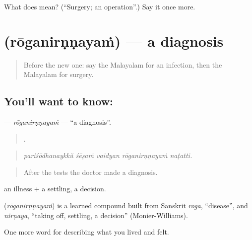 \begin{tcolorbox}[breakable,colback=teal!4,colframe=teal!35!black,title={Before you move on}]
What does  mean? (\textquotedblleft{}Surgery; an operation\textquotedblright{}.) Say it once more.
\end{tcolorbox}
\section[\texorpdfstring{\ml{രോഗനിർണ്ണയം} (rōganirṇṇayaṁ)}{രോഗനിർണ്ണയം (rōganirṇṇayaṁ)}]{ (rōganirṇṇayaṁ) — a diagnosis}

\label{lesson:ML-C532-roganirnnayam}



\begin{quote}
Before the new one: say the Malayalam for an infection, then the Malayalam for surgery.
\end{quote}

\subsection*{You'll want to know: }
\textbf{} — \emph{rōganirṇṇayaṁ} — \textquotedblleft{}a diagnosis\textquotedblright{}.

\begin{quote}
    .
\end{quote}

\begin{quote}
\emph{pariśōdhanaykkŭ śēṣaṁ vaidyan rōganirṇṇayaṁ naṭatti.}
\end{quote}

\begin{quote}
After the tests the doctor made a diagnosis.
\end{quote}

 an illness +  a settling, a decision.

\begin{cousinweb}
\textbf{} (\emph{rōganirṇṇayaṁ}) is a learned compound built from Sanskrit \emph{roga}, \textquotedblleft{}disease\textquotedblright{}, and \emph{nirṇaya}, \textquotedblleft{}taking off, settling, a decision\textquotedblright{} (Monier-Williams).
\end{cousinweb}

\begin{grammarlens}[title={What you've built}]
One more word for describing what you lived and felt.
\end{grammarlens}

